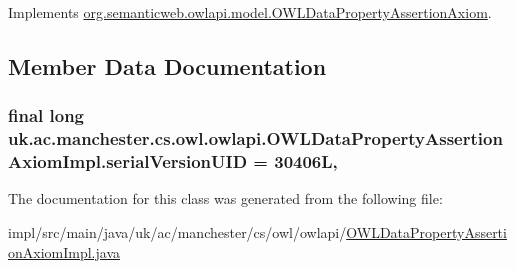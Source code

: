 Implements \hyperlink{interfaceorg_1_1semanticweb_1_1owlapi_1_1model_1_1_o_w_l_data_property_assertion_axiom_ac834b42e78a0d90077140d0d52ed59e2}{org.\-semanticweb.\-owlapi.\-model.\-O\-W\-L\-Data\-Property\-Assertion\-Axiom}.



\subsection{Member Data Documentation}
\hypertarget{classuk_1_1ac_1_1manchester_1_1cs_1_1owl_1_1owlapi_1_1_o_w_l_data_property_assertion_axiom_impl_a6af0c82b3eedf9537caffbc5d53c411c}{
\subsubsection[{serial\-Version\-U\-I\-D}]{\setlength{\rightskip}{0pt plus 5cm}final long uk.\-ac.\-manchester.\-cs.\-owl.\-owlapi.\-O\-W\-L\-Data\-Property\-Assertion\-Axiom\-Impl.\-serial\-Version\-U\-I\-D = 30406\-L\hspace{0.3cm}{\ttfamily [static]}, {\ttfamily [private]}}}\label{classuk_1_1ac_1_1manchester_1_1cs_1_1owl_1_1owlapi_1_1_o_w_l_data_property_assertion_axiom_impl_a6af0c82b3eedf9537caffbc5d53c411c}


The documentation for this class was generated from the following file\-:\begin{DoxyCompactItemize}
\item 
impl/src/main/java/uk/ac/manchester/cs/owl/owlapi/\hyperlink{_o_w_l_data_property_assertion_axiom_impl_8java}{O\-W\-L\-Data\-Property\-Assertion\-Axiom\-Impl.\-java}\end{DoxyCompactItemize}
